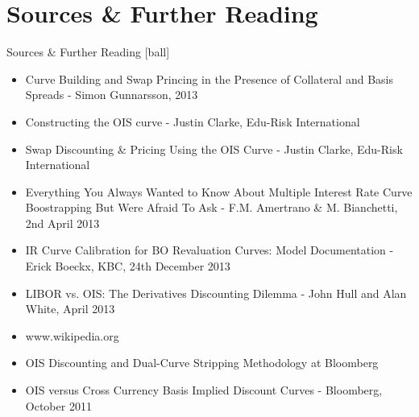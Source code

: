 \documentclass{beamer}
\begin{document}
\section{Sources \& Further Reading}

\begin{frame}{Sources \& Further Reading}
[ball]
\begin{itemize}
\item Curve Building and Swap Princing in the Presence of Collateral and Basis Spreads - Simon Gunnarsson, 2013
\item Constructing the OIS curve - Justin Clarke, Edu-Risk International
\item Swap Discounting \& Pricing Using the OIS Curve - Justin Clarke, Edu-Risk International
\item Everything You Always Wanted to Know About Multiple Interest Rate Curve Boostrapping But Were Afraid To Ask - F.M. Amertrano \& M. Bianchetti, 2nd April 2013
\item IR Curve Calibration for BO Revaluation Curves: Model Documentation - Erick Boeckx, KBC, 24th December 2013
\item LIBOR vs. OIS: The Derivatives Discounting Dilemma - John Hull and Alan White, April 2013
\item www.wikipedia.org
\item OIS Discounting and Dual-Curve Stripping Methodology at Bloomberg
\item OIS versus Cross Currency Basis Implied Discount Curves - Bloomberg, October 2011
\end{itemize}
\end{frame}
\end{document}
